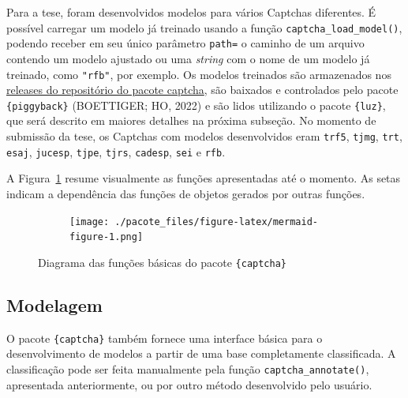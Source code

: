 \documentclass[12pt,twoside,brazilian]{book}
\begin{document}
Para a tese, foram desenvolvidos modelos para vários Captchas
diferentes. É possível carregar um modelo já treinado usando a função
\texttt{captcha\_load\_model()}, podendo receber em seu único parâmetro
\texttt{path=} o caminho de um arquivo contendo um modelo ajustado ou
uma \emph{string} com o nome de um modelo já treinado, como
\texttt{"rfb"}, por exemplo. Os modelos treinados são armazenados nos
\href{https://github.com/decryptr/captcha/releases}{releases do
repositório do pacote captcha}, são baixados e controlados pelo pacote
\texttt{\{piggyback\}} (BOETTIGER; HO, 2022) e são lidos utilizando o
pacote \texttt{\{luz\}}, que será descrito em maiores detalhes na
próxima subseção. No momento de submissão da tese, os Captchas com
modelos desenvolvidos eram \texttt{trf5}, \texttt{tjmg}, \texttt{trt},
\texttt{esaj}, \texttt{jucesp}, \texttt{tjpe}, \texttt{tjrs},
\texttt{cadesp}, \texttt{sei} e \texttt{rfb}.

A Figura~\ref{fig-diagrama-captcha-simples} resume visualmente as
funções apresentadas até o momento. As setas indicam a dependência das
funções de objetos gerados por outras funções.

\begin{figure}

{\centering 

\begin{figure}[H]

{\centering \texttt{[image: ./pacote\_files/figure-latex/mermaid-figure-1.png]}

}

\end{figure}

}

\caption{\label{fig-diagrama-captcha-simples}Diagrama das funções
básicas do pacote \texttt{\{captcha\}}}

\end{figure}

\hypertarget{sec-ap-modelagem}{%
\subsection{Modelagem}\label{sec-ap-modelagem}}

O pacote \texttt{\{captcha\}} também fornece uma interface básica para o
desenvolvimento de modelos a partir de uma base completamente
classificada. A classificação pode ser feita manualmente pela função
\texttt{captcha\_annotate()}, apresentada anteriormente, ou por outro
método desenvolvido pelo usuário.
\end{document}
